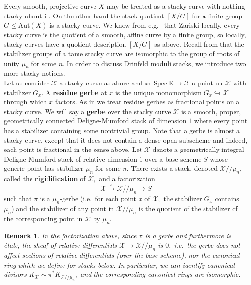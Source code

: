 \documentclass[11pt]{amsart}
\newtheorem{remark}[theorem]{Remark}
\theoremstyle{definition}
\numberwithin{equation}{section}
\newcommand{\Aut}{\mathrm{Aut}} 	%
\newcommand{\Spec}{\operatorname{Spec}} 	%
\newcommand{\sX}{\mathscr{X}}		%
\newcommand{\bbK}{\mathbb{K}}		%
\begin{document}
		Every smooth, projective curve $X$ may be treated as a stacky curve with nothing stacky about it. On the other hand the stack quotient $[X/G]$ for a finite group $G\leq \Aut(X)$ is a stacky curve. We know from e.g.\ \cite[Remark $5.2.8$]{VZB} that Zariski locally, every stacky curve is the quotient of a smooth, affine curve by a finite group, so locally, stacky curves have a quotient description $[X/G]$ as above. Recall from \cite[Lemma $5.3.10.(b)$]{VZB} that the stabilizer groups of a tame stacky curve are isomorphic to the group of roots of unity $\mu_n$ for some $n.$ In order to discuss Drinfeld moduli stacks, we introduce two more stacky notions.\\
		
		Let us consider $\sX$ a stacky curve as above and $x:\Spec \bbK\to\sX$ a point on $\sX$ with stabilizer $G_x.$ A \textbf{residue gerbe} at $x$ is the unique monomorphism $G_x\hookrightarrow \sX$ through which $x$ factors. As in \cite{VZB} we treat residue gerbes as fractional points on a stacky curve. We will say a \textbf{gerbe} over the stacky curve $\sX$ is a smooth, proper, geometrically connected Deligne-Mumford stack of dimension $1$ where every point has a stabilizer containing some nontrivial group. Note that a gerbe is almost a stacky curve, except that it does not contain a dense open subscheme and indeed, each point is fractional in the sense above. Let $\sX$ denote a geometrically integral Deligne-Mumford stack of relative dimension $1$ over a base scheme $S$ whose generic point has stabilizer $\mu_n$ for some $n.$ There exists a stack, denoted $\sX/\!/\mu_n,$ called the \textbf{rigidification} of $\sX,$ and a factorization 
		\[\sX\overset{\pi}{\to}\sX/\!/\mu_n\to S\] 
		such that $\pi$ is a $\mu_n$-gerbe (i.e.\ for each point $x$ of $\sX,$ the stabilizer $G_x$ contains $\mu_n$) and the stabilizer of any point in $\sX/\!/\mu_n$ is the quotient of the stabilizer of the corresponding point in $\sX$ by $\mu_n.$
		
		\begin{remark}
			In the factorization above, since $\pi$ is a gerbe and furthermore is \'etale, the sheaf of relative differentials $\sX\to \sX/\!/\mu_n$ is $0,$ i.e.\ the gerbe does not affect sections of relative differentials (over the base scheme), nor the canonical ring which we define for stacks below. In particular, we can identify canonical divisors $K_{\sX}\sim \pi^*K_{\sX/\!/\mu_n},$ and the corresponding canonical rings are isomorphic. 
		\end{remark}
		
\end{document}
